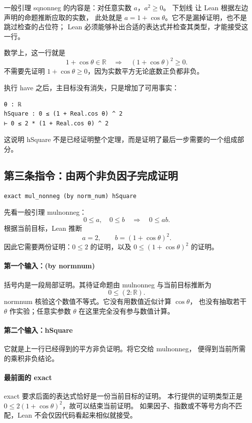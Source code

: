 \documentclass[UTF8,fontset=fandol,a4paper,11pt]{ctexart}
\newcommand{\code}[1]{{\small\ttfamily\def\_{\textunderscore\allowbreak}#1}}
\newcommand{\step}[1]{\Needspace{7\baselineskip}\subsection{#1}}
\begin{document}
一般引理 \code{sq\_nonneg} 的内容是：对任意实数 $a$，$a^2\ge0$。
下划线 \code{\_} 让 Lean 根据左边声明的命题推断应取的实数，
此处就是 $a=1+\cos\theta$。它不是漏掉证明，也不是跳过检查的占位符；
Lean 必须能够补出合适的表达式并检查其类型，才能接受这一行。

数学上，这一行就是
\[
  1+\cos\theta\in\mathbb R
  \quad\Longrightarrow\quad
  (1+\cos\theta)^2\ge0.
\]
不需要先证明 $1+\cos\theta\ge0$，因为实数平方无论底数正负都非负。

执行 \code{have} 之后，主目标没有消失，只是增加了可用事实：
\begin{Verbatim}
θ : ℝ
hSquare : 0 ≤ (1 + Real.cos θ) ^ 2
⊢ 0 ≤ 2 * (1 + Real.cos θ) ^ 2
\end{Verbatim}
这说明 \code{hSquare} 不是已经证明整个定理，而是证明了最后一步需要的一个组成部分。

\step{第三条指令：由两个非负因子完成证明}
\begin{Verbatim}
exact mul_nonneg (by norm_num) hSquare
\end{Verbatim}
先看一般引理 \code{mul\_nonneg}：
\[
  0\le a,\quad 0\le b
  \quad\Longrightarrow\quad 0\le ab.
\]
根据当前目标，Lean 推断
\[
  a=2,\qquad b=(1+\cos\theta)^2.
\]
因此它需要两份证明：$0\le2$ 的证明，以及
$0\le(1+\cos\theta)^2$ 的证明。

\paragraph{第一个输入：\code{(by norm\_num)}}
括号内是一段局部证明。其待证命题由 \code{mul\_nonneg} 与当前目标推断为
\[
  0\le(2:\mathbb R).
\]
\code{norm\_num} 核验这个数值不等式。它没有用数值近似计算 $\cos\theta$，
也没有抽取若干 $\theta$ 作实验；任意实参数 $\theta$ 在这里完全没有参与数值计算。

\paragraph{第二个输入：\code{hSquare}}
它就是上一行已经得到的平方非负证明。将它交给 \code{mul\_nonneg}，
便得到当前所需的乘积非负结论。

\paragraph{最前面的 \code{exact}}
\code{exact} 要求后面的表达式恰好是一份当前目标的证明。
本行提供的证明类型正是 $0\le2(1+\cos\theta)^2$，故可以结束当前证明。
如果因子、指数或不等号方向不匹配，Lean 不会仅因代码看起来相似就接受。
\end{document}

